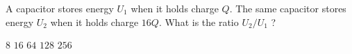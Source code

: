 \begin{questions}\setcounter{question}{5}\question
A capacitor stores energy $U_{1}$ when it holds charge $Q$. The same capacitor stores energy $U_{2}$ when it holds charge $16 Q$. What is the ratio $U_{2} / U_{1}$ ?

\begin{oneparchoices}
\choice $8$
\choice $16$
\choice $64$
\choice $128$
\choice $256$
\end{oneparchoices}\end{questions}
